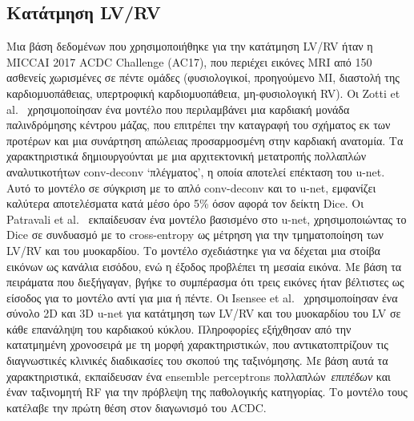 \subsection{Κατάτμηση LV/RV}
Μια βάση δεδομένων που χρησιμοποιήθηκε για την κατάτμηση LV/RV ήταν η MICCAI 2017 ACDC Challenge (AC17), που περιέχει εικόνες MRI από 150 ασθενείς χωρισμένες σε πέντε ομάδες (φυσιολογικοί, προηγούμενο MI, διαστολή της καρδιομυοπάθειας, υπερτροφική καρδιομυοπάθεια, μη-φυσιολογική RV).
Οι Zotti et al.~\cite{zotti2017gridnet} χρησιμοποίησαν ένα μοντέλο που περιλαμβάνει μια καρδιακή μονάδα παλινδρόμησης κέντρου μάζας, που επιτρέπει την καταγραφή του σχήματος εκ των προτέρων και μια συνάρτηση απώλειας προσαρμοσμένη στην καρδιακή ανατομία.
Τα χαρακτηριστικά δημιουργούνται με μια αρχιτεκτονική μετατροπής πολλαπλών αναλυτικοτήτων conv-deconv `πλέγματος', η οποία αποτελεί επέκταση του u-net.
Αυτό το μοντέλο σε σύγκριση με το απλό conv-deconv και το u-net, εμφανίζει καλύτερα αποτελέσματα κατά μέσο όρο 5\% όσον αφορά τον δείκτη Dice.
Οι Patravali et al.~\cite{patravali20172d} εκπαίδευσαν ένα μοντέλο βασισμένο στο u-net, χρησιμοποιώντας το Dice σε συνδυασμό με το cross-entropy ως μέτρηση για την τμηματοποίηση των LV/RV και του μυοκαρδίου.
Το μοντέλο σχεδιάστηκε για να δέχεται μια στοίβα εικόνων ως κανάλια εισόδου, ενώ η έξοδος προβλέπει τη μεσαία εικόνα.
Με βάση τα πειράματα που διεξήγαγαν, βγήκε το συμπέρασμα ότι τρεις εικόνες ήταν βέλτιστες ως είσοδος για το μοντέλο αντί για μια ή πέντε.
Οι Isensee et al.~\cite{isensee2017automatic} χρησιμοποίησαν ένα σύνολο 2D και 3D u-net για κατάτμηση των LV/RV και του μυοκαρδίου του LV σε κάθε επανάληψη του καρδιακού κύκλου.
Πληροφορίες εξήχθησαν από την κατατμημένη χρονοσειρά με τη μορφή χαρακτηριστικών, που αντικατοπτρίζουν τις διαγνωστικές κλινικές διαδικασίες του σκοπού της ταξινόμησης.
Με βάση αυτά τα χαρακτηριστικά, εκπαίδευσαν ένα ensemble perceptrons πολλαπλών~\textit{επιπέδων} και έναν ταξινομητή RF για την πρόβλεψη της παθολογικής κατηγορίας.
Το μοντέλο τους κατέλαβε την πρώτη θέση στον διαγωνισμό του ACDC\@.

